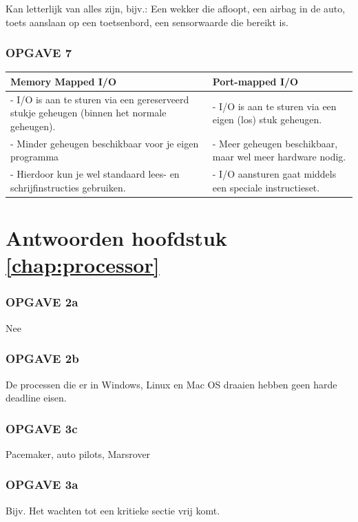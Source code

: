 Kan letterlijk van alles zijn, bijv.: Een wekker die afloopt, een airbag in de auto, toets aanslaan op een toetsenbord, een sensorwaarde die bereikt is. 

\subsubsection{OPGAVE 7}

\hspace{-10mm}
\begin{tabular}[t]{|p{70mm}|p{70mm}|}
    \hline
    Memory Mapped I/O & Port-mapped I/O \\
    \hline \hline
    - I/O is aan te sturen via een gereserveerd stukje geheugen (binnen het normale geheugen). & - I/O is aan te sturen via een eigen (los) stuk geheugen.\\
    - Minder geheugen beschikbaar voor je eigen programma & - Meer geheugen beschikbaar, maar wel meer hardware nodig. \\
    - Hierdoor kun je wel standaard lees- en schrijfinstructies gebruiken. & - I/O aansturen gaat middels een speciale instructieset.\\
    \hline
\end{tabular}


\newpage
\section{Antwoorden hoofdstuk \ref{chap:processor}}
\subsubsection{OPGAVE 2a}
Nee

\subsubsection{OPGAVE 2b}
De processen die er in Windows, Linux en Mac OS draaien hebben geen harde deadline eisen. 

\subsubsection{OPGAVE 3c}
Pacemaker, auto pilots, Marsrover

\subsubsection{OPGAVE 3a}
Bijv. Het wachten tot een kritieke sectie vrij komt.


